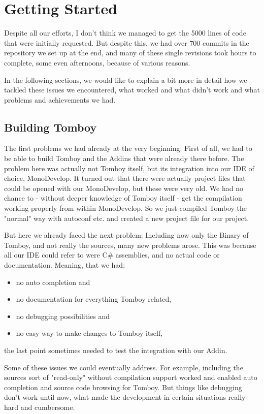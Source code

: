 \section{Getting Started} \label{beginning}

Despite all our efforts, I don't think we managed to get the 5000 lines of code that were initially requested. But despite this, we had over 700 commits in the repository we set up at the end, and many of these single revisions took hours to complete, some even afternoons, because of various reasons.

In the following sections, we would like to explain a bit more in detail how we tackled these issues we encountered, what worked and what didn't work and what problems and achievements we had.

\subsection{Building Tomboy}
\label{building_tomboy}
The first problems we had already at the very beginning: First of all, we had to be able to build Tomboy and the Addins that were already there before. The problem here was actually not Tomboy itself, but its integration into our IDE of choice, MonoDevelop. It turned out that there were actually project files that could be opened with our MonoDevelop, but these were very old. We had no chance to - without deeper knowledge of Tomboy itself - get the compilation working properly from within MonoDevelop. So we just compiled Tomboy the "normal" way with autoconf etc. and created a new project file for our project.

But here we already faced the next problem: Including now only the Binary of Tomboy, and not really the sources, many new problems arose. This was because all our IDE could refer to were C\# assemblies, and no actual code or documentation. Meaning, that we had:
\begin{itemize}
\item no auto completion and
\item no documentation for everything Tomboy related,
\item no debugging possibilities and
\item no easy way to make changes to Tomboy itself,
\end{itemize}
the last point sometimes needed to test the integration with our Addin.

Some of these issues we could eventually address. For example, including the sources sort of "read-only" without compilation support worked and enabled auto completion and source code browsing for Tomboy. But things like debugging don't work until now, what made the development in certain situations really hard and cumbersome.

